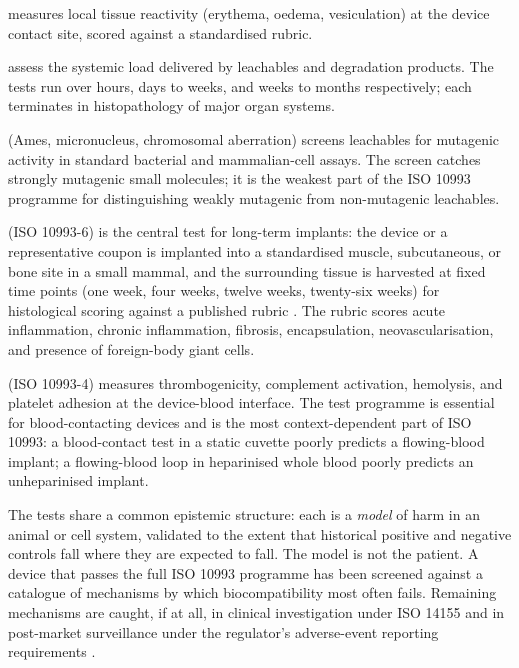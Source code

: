  measures local tissue reactivity (erythema,
oedema, vesiculation) at the device contact site, scored against
a standardised rubric.

assess the systemic load delivered by leachables and degradation
products. The tests run over hours, days to weeks, and weeks to
months respectively; each terminates in histopathology of major
organ systems.

 (Ames, micronucleus, chromosomal aberration)
screens leachables for mutagenic activity in standard bacterial and
mammalian-cell assays. The screen catches strongly mutagenic
small molecules; it is the weakest part of the ISO 10993 programme
for distinguishing weakly mutagenic from non-mutagenic leachables.

 (ISO 10993-6) is the central test for
long-term implants: the device or a representative coupon is
implanted into a standardised muscle, subcutaneous, or bone site
in a small mammal, and the surrounding tissue is harvested at
fixed time points (one week, four weeks, twelve weeks, twenty-six
weeks) for histological scoring against a published rubric
\cite{std:v6c12-iso-10993-6-2016}. The rubric scores acute
inflammation, chronic inflammation, fibrosis, encapsulation,
neovascularisation, and presence of foreign-body giant cells.

 (ISO 10993-4) measures thrombogenicity,
complement activation, hemolysis, and platelet adhesion at the
device-blood interface. The test programme is essential for
blood-contacting devices and is the most context-dependent part of
ISO 10993: a blood-contact test in a static cuvette poorly predicts
a flowing-blood implant; a flowing-blood loop in heparinised whole
blood poorly predicts an unheparinised implant.

The tests share a common epistemic structure: each is a
\emph{model} of harm in an animal or cell system, validated to
the extent that historical positive and negative controls fall
where they are expected to fall. The model is not the patient.
A device that passes the full ISO 10993 programme has been
screened against a catalogue of mechanisms by which biocompatibility
most often fails. Remaining mechanisms are caught, if at all, in
clinical investigation under ISO 14155 and in post-market
surveillance under the regulator's adverse-event reporting
requirements
\cite{std:v6c12-iso-14155-2020}.

